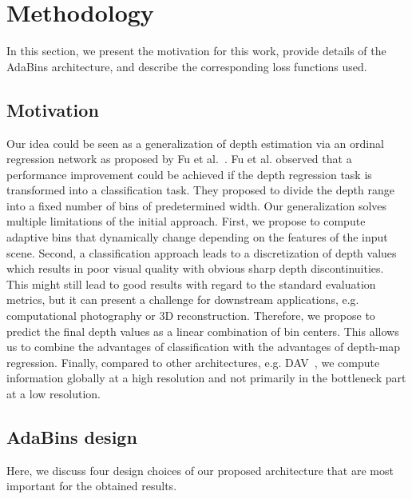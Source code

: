 \documentclass[final]{cvpr}
\begin{document}
\section{Methodology}

In this section, we present the motivation for this work, provide details of the AdaBins architecture, and describe the corresponding loss functions used.

\subsection{Motivation}
Our idea could be seen as a generalization of depth estimation via an ordinal regression network as proposed by Fu et al.~\cite{Fu2018DeepOR}. Fu et al. observed that a performance improvement could be achieved if the depth regression task is transformed into a classification task. They proposed to divide the depth range into a fixed number of bins of predetermined width. Our generalization solves multiple limitations of the initial approach.
%
First, we propose to compute adaptive bins that dynamically change depending on the features of the input scene. 
Second, a classification approach leads to a discretization of depth values which results in poor visual quality with obvious sharp depth discontinuities. This might still lead to good results with regard to the standard evaluation metrics, but it can present a challenge for downstream applications, e.g. computational photography or 3D reconstruction. Therefore, we propose to predict the final depth values as a linear combination of bin centers. This allows us to combine the advantages of classification with the advantages of depth-map regression.
Finally, compared to other architectures, e.g. DAV~\cite{dav_huynh2020guiding}, we compute information globally at a high resolution and not primarily in the bottleneck part at a low resolution.


\subsection{AdaBins design}
\label{sec:adabins-design-choices}

Here, we discuss four design choices of our proposed architecture that are most important for the obtained results.
\end{document}
